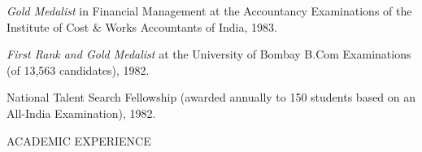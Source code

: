 \documentclass{article}
\begin{document}
\begin{description}
\begin{etaremune}
\item {\it Gold Medalist} in Financial Management at the
Accountancy Examinations of the Institute of
Cost \& Works Accountants of India, 1983. 

\item {\it First Rank and Gold Medalist} at the University of Bombay B.Com 
Examinations (of 13,563 candidates), 1982. 

\item National Talent Search Fellowship (awarded annually to 150
students based on an All-India Examination), 1982. 

\end{etaremune}

\end{description}



\begin{description} 
\item[ACADEMIC EXPERIENCE] \mbox{}

\begin{itemize}
\setlength\itemsep{-0.1em}


\end{itemize}
\end{description}
\end{document}
